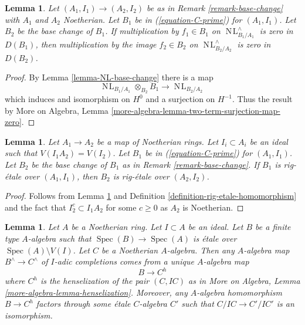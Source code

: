 \documentclass{stacks-project}
\theoremstyle{plain}
\newtheorem{lemma}[subsection]{Lemma}
\theoremstyle{definition}
\theoremstyle{remark}
\numberwithin{equation}{subsection}
\def\Spec{\mathop{\mathrm{Spec}}}
\def\NL{\mathop{N\!L}\nolimits}
\begin{document}
\begin{lemma}
\label{lemma-zero-after-modding-out}
Let $(A_1, I_1) \to (A_2, I_2)$ be as in
Remark \ref{remark-base-change} with $A_1$ and $A_2$ Noetherian.
Let $B_1$ be in (\ref{equation-C-prime}) for $(A_1, I_1)$.
Let $B_2$ be the base change of $B_1$.
If multiplication by $f_1 \in B_1$ on $\NL^\wedge_{B_1/A_1}$
is zero in $D(B_1)$, then multiplication by
the image $f_2 \in B_2$ on $\NL^\wedge_{B_2/A_2}$ is zero
in $D(B_2)$.
\end{lemma}

\begin{proof}
By Lemma \ref{lemma-NL-base-change} there is a map
$$
\NL_{B_1/A_1} \otimes_{B_2} B_1 \to \NL_{B_2/A_2}
$$
which induces and isomorphism on $H^0$ and a surjection on $H^{-1}$.
Thus the result by
More on Algebra, Lemma \ref{more-algebra-lemma-two-term-surjection-map-zero}.
\end{proof}

\begin{lemma}
\label{lemma-base-change-rig-etale-homomorphism}
Let $A_1 \to A_2$ be a map of Noetherian rings. Let $I_i \subset A_i$
be an ideal such that $V(I_1A_2) = V(I_2)$. Let $B_1$ be in
(\ref{equation-C-prime}) for $(A_1, I_1)$.
Let $B_2$ be the base change of $B_1$ as in
Remark \ref{remark-base-change}.
If $B_1$ is rig-\'etale over $(A_1, I_1)$,
then $B_2$ is rig-\'etale over $(A_2, I_2)$.
\end{lemma}

\begin{proof}
Follows from Lemma \ref{lemma-zero-after-modding-out} and
Definition \ref{definition-rig-etale-homomorphism} and the fact
that $I_2^c \subset I_1A_2$ for some $c \geq 0$ as $A_2$ is Noetherian.
\end{proof}

\begin{lemma}
\label{lemma-fully-faithful-etale-over-complement}
Let $A$ be a Noetherian ring. Let $I \subset A$ be an ideal.
Let $B$ be a finite type $A$-algebra such that
$\Spec(B) \to \Spec(A)$ is \'etale over $\Spec(A) \setminus V(I)$.
Let $C$ be a Noetherian $A$-algebra. Then any $A$-algebra
map $B^\wedge \to C^\wedge$ of $I$-adic completions
comes from a unique $A$-algebra map
$$
B \longrightarrow C^h
$$
where $C^h$ is the henselization of the pair $(C, IC)$ as
in More on Algebra, Lemma \ref{more-algebra-lemma-henselization}.
Moreover, any $A$-algebra homomorphism $B \to C^h$ factors through
some \'etale $C$-algebra $C'$ such that $C/IC \to C'/IC'$ is an isomorphism.
\end{lemma}
\end{document}
